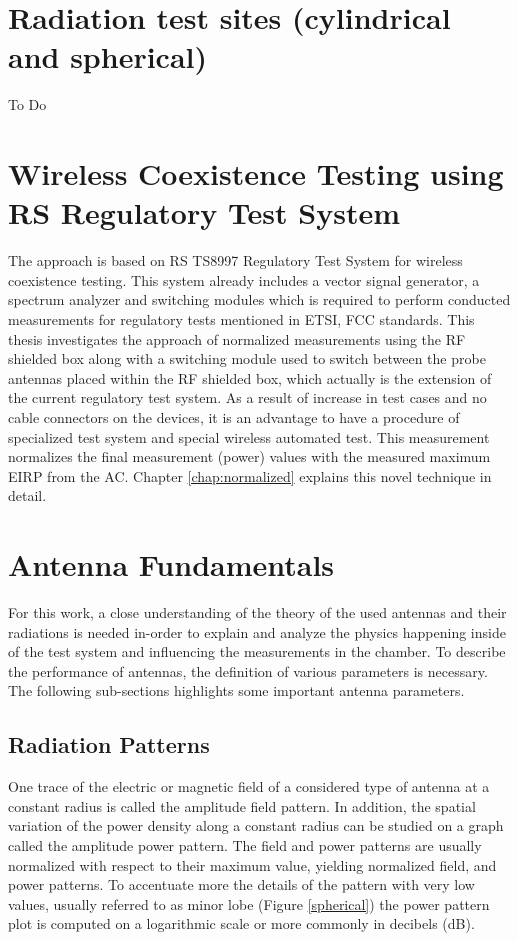  

\section{Radiation test sites (cylindrical and spherical)}

To Do




\section{Wireless Coexistence Testing using \acs{RS}\textregistered{} Regulatory Test System}
The approach is based on \acs{RS}\textregistered{} TS8997 Regulatory Test System for wireless coexistence testing. This system already includes a vector signal generator, a spectrum analyzer and switching modules which is required to perform conducted measurements for regulatory tests mentioned in \acs{ETSI}, \acs{FCC} standards. This thesis investigates the approach of normalized measurements using the \acs{RF} shielded box along with a switching module used to switch between the probe antennas placed within the \acs{RF} shielded box, which actually is the extension of the current regulatory test system. As a result of increase in test cases and no cable connectors on the devices, it is an advantage to have a procedure of specialized test system and special wireless automated test. This measurement normalizes the final measurement (power) values with the measured maximum \acs{EIRP} from the \acs{AC}. Chapter \ref{chap:normalized} explains this novel technique in detail.

\section{Antenna Fundamentals}
For this work, a close understanding of the theory of the used antennas and their radiations is needed in-order to explain and analyze the physics happening inside of the test system and influencing the measurements in the chamber. To describe the performance of antennas, the definition of various parameters is necessary. The following sub-sections highlights some important antenna parameters.

\subsection{Radiation Patterns}
One trace of the electric or magnetic field of a considered type of antenna at a constant radius is called the amplitude field pattern. In addition, the spatial variation of the power density along a constant radius can be studied on a graph called the amplitude power pattern. The field and power patterns are usually normalized with respect to their maximum value, yielding normalized field, and power patterns. To accentuate more the details of the pattern with very low values, usually referred to as minor lobe (Figure \ref{spherical}) the power pattern plot is computed on a logarithmic scale or more commonly in decibels (dB). \\

